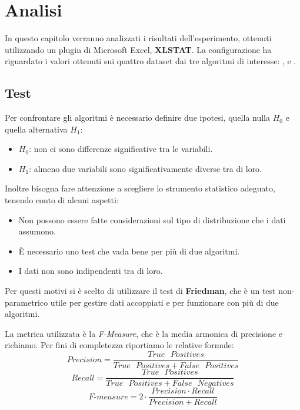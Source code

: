 \chapter{Analisi}

\normalsize
In questo capitolo verranno analizzati i risultati dell'esperimento, ottenuti utilizzando un plugin di Microsoft Excel, \textbf{XLSTAT}. La configurazione ha riguardato i valori ottenuti sui quattro dataset dai tre algoritmi di interesse: ,  e .

\section{Test}

Per confrontare gli algoritmi è necessario definire due ipotesi, quella nulla $H_0$ e quella alternativa $H_1$:

\begin{itemize}
	\item $H_0$: non ci sono differenze significative tra le variabili.
	\item $H_1$: almeno due variabili sono significativamente diverse tra di loro.
\end{itemize}

\noindent
Inoltre bisogna fare attenzione a scegliere lo strumento statistico adeguato, tenendo conto di alcuni aspetti:
\begin{itemize}
	\item Non possono essere fatte considerazioni sul tipo di distribuzione che i dati assumono.
	\item È necessario uno test che vada bene per più di due algoritmi.
	\item I dati non sono indipendenti tra di loro.
\end{itemize}

Per questi motivi si è scelto di utilizzare il test di \textbf{Friedman}, che è un test non-parametrico utile per gestire dati accoppiati e per funzionare con più di due algoritmi\cite{Demsar:2006:SCC:1248547.1248548}.

La metrica utilizzata è la \emph{F-Measure}, che è la media armonica di precisione e richiamo. Per fini di completezza riportiamo le relative formule:
$$Precision = \frac{True\mbox{ }Positives}{True\mbox{ }Positives + False\mbox{ }Positives}$$
$$Recall = \frac{True\mbox{ }Positives}{True\mbox{ }Positives + False\mbox{ }Negatives}$$
$$ F\mbox{-}measure = 2 \cdot \frac{Precision \cdot Recall}{Precision + Recall} $$


